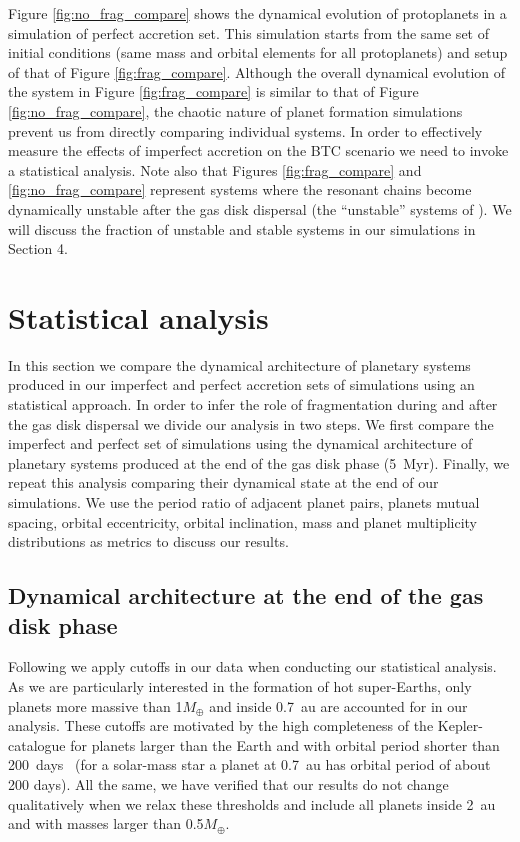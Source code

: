 \documentclass[fleqn,usenatbib]{mnras}
\begin{document}
Figure \ref{fig:no_frag_compare} shows the dynamical evolution of protoplanets in a simulation of perfect accretion set. This simulation starts from the same set of initial conditions (same mass and orbital elements for all protoplanets) and setup of that of Figure \ref{fig:frag_compare}. Although the overall dynamical evolution of the system in Figure \ref{fig:frag_compare} is similar to that of Figure \ref{fig:no_frag_compare}, the chaotic nature of planet formation simulations prevent us from directly comparing individual systems. In order to effectively measure the effects of imperfect accretion on the BTC scenario we need to invoke a statistical analysis. Note also that Figures \ref{fig:frag_compare} and \ref{fig:no_frag_compare} represent systems where the resonant chains become dynamically unstable after the gas disk dispersal (the ``unstable'' systems of \cite{izidoro2019formation}). We will discuss the fraction of unstable and stable systems in our simulations in Section 4.



\section{Statistical analysis}\label{sec:stat_analysis}

In this section we compare the dynamical architecture of planetary systems produced in our imperfect and perfect accretion sets of simulations using an statistical approach. In order to infer the role of fragmentation during and after the gas disk dispersal we divide our analysis in two steps. We first compare the imperfect and perfect set of simulations using the dynamical architecture of planetary systems produced at the end of the gas disk phase (5~Myr). Finally, we repeat this analysis comparing their dynamical state at the end of our simulations. We use the period ratio of adjacent planet pairs, planets mutual spacing, orbital eccentricity, orbital inclination, mass and planet multiplicity distributions as metrics to discuss our results.


\subsection{Dynamical architecture at the end of the gas disk phase}\label{subsec:gasdiskphase}


Following \cite{izidoro2019formation} we apply cutoffs in our data when conducting our statistical analysis. As we are particularly interested in the formation of hot super-Earths, only planets more massive than 1$M_{\oplus}$ and inside 0.7~au are accounted for in our analysis. These cutoffs are motivated by the high completeness of the Kepler-catalogue for planets larger than the Earth and with orbital period shorter than 200~days~\citep{petigura2013plateau} (for a solar-mass star a planet at 0.7~au has orbital period of about 200 days). All the same, we have verified that our results do not change qualitatively when we relax these thresholds and include all planets inside 2~au and with masses larger than 0.5$M_{\oplus}$.
\end{document}
